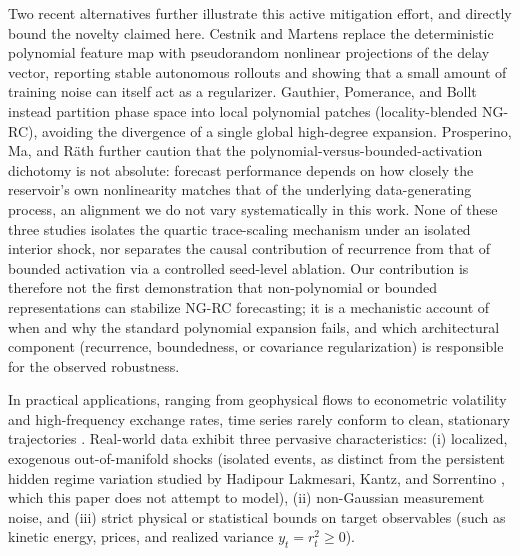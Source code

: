 \documentclass[aip,cha,reprint,amsmath,amssymb]{revtex4-2}
\begin{document}
Two recent alternatives further illustrate this active mitigation effort, and directly bound the novelty claimed here. Cestnik and Martens \cite{cestnik2026ngrc} replace the deterministic polynomial feature map with pseudorandom nonlinear projections of the delay vector, reporting stable autonomous rollouts and showing that a small amount of training noise can itself act as a regularizer. Gauthier, Pomerance, and Bollt \cite{gauthier2025locality} instead partition phase space into local polynomial patches (locality-blended NG-RC), avoiding the divergence of a single global high-degree expansion. Prosperino, Ma, and R\"ath \cite{prosperino2025tailored} further caution that the polynomial-versus-bounded-activation dichotomy is not absolute: forecast performance depends on how closely the reservoir's own nonlinearity matches that of the underlying data-generating process, an alignment we do not vary systematically in this work. None of these three studies isolates the quartic trace-scaling mechanism under an isolated interior shock, nor separates the causal contribution of recurrence from that of bounded activation via a controlled seed-level ablation. Our contribution is therefore not the first demonstration that non-polynomial or bounded representations can stabilize NG-RC forecasting; it is a mechanistic account of when and why the standard polynomial expansion fails, and which architectural component (recurrence, boundedness, or covariance regularization) is responsible for the observed robustness.

In practical applications, ranging from geophysical flows to econometric volatility and high-frequency exchange rates, time series rarely conform to clean, stationary trajectories \cite{carroll2020dimension,vlachas2020backpropagation}. Real-world data exhibit three pervasive characteristics: (i) localized, exogenous out-of-manifold shocks (isolated events, as distinct from the persistent hidden regime variation studied by Hadipour Lakmesari, Kantz, and Sorrentino \cite{lakmesari2026regime}, which this paper does not attempt to model), (ii) non-Gaussian measurement noise, and (iii) strict physical or statistical bounds on target observables (such as kinetic energy, prices, and realized variance $y_t = r_t^2 \ge 0$).
\end{document}
